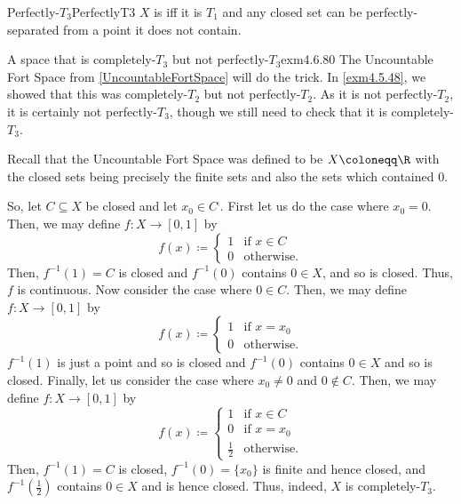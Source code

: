 \begin{dfn}{Perfectly-$T_3$}{PerfectlyT3}
$X$ is  iff it is $T_1$ and any closed set can be perfectly-separated from a point it does not contain.
\end{dfn}
\begin{exm}{A space that is completely-$T_3$ but not perfectly-$T_3$}{exm4.6.80}
The Uncountable Fort Space from \cref{UncountableFortSpace} will do the trick.  In \cref{exm4.5.48}, we showed that this was completely-$T_2$ but not perfectly-$T_2$.  As it is not perfectly-$T_2$, it is certainly not perfectly-$T_3$, though we still need to check that it is completely-$T_3$.

Recall that the Uncountable Fort Space was defined to be $X\coloneqq \R$ with the closed sets being precisely the finite sets and also the sets which contained $0$.

So, let $C\subseteq X$ be closed and let $x_0\in C^{\comp}$.  First let us do the case where $x_0=0$.  Then, we may define $f\colon X\rightarrow [0,1]$ by
\begin{equation}
f(x)\coloneqq \begin{cases}1 & \text{if }x\in C \\ 0 & \text{otherwise.}\end{cases}
\end{equation}
Then, $f^{-1}(1)=C$ is closed and $f^{-1}(0)$ contains $0\in X$, and so is closed.  Thus, $f$ is continuous.  Now consider the case where $0\in C$.  Then, we may define $f\colon X\rightarrow [0,1]$ by
\begin{equation}
f(x)\coloneqq \begin{cases}1 & \text{if }x=x_0 \\ 0 & \text{otherwise.}\end{cases}
\end{equation}
$f^{-1}(1)$ is just a point and so is closed and $f^{-1}(0)$ contains $0\in X$ and so is closed.  Finally, let us consider the case where $x_0\neq 0$ and $0\notin C$.  Then, we may define $f\colon X\rightarrow [0,1]$ by
\begin{equation}
f(x)\coloneqq \begin{cases}1 & \text{if }x\in C \\ 0 & \text{if }x=x_0 \\ \tfrac{1}{2} & \text{otherwise.}\end{cases}
\end{equation}
Then, $f^{-1}(1)=C$ is closed, $f^{-1}(0)=\{ x_0\}$ is finite and hence closed, and $f^{-1}(\frac{1}{2})$ contains $0\in X$ and is hence closed.  Thus, indeed, $X$ is completely-$T_3$.
\end{exm}
